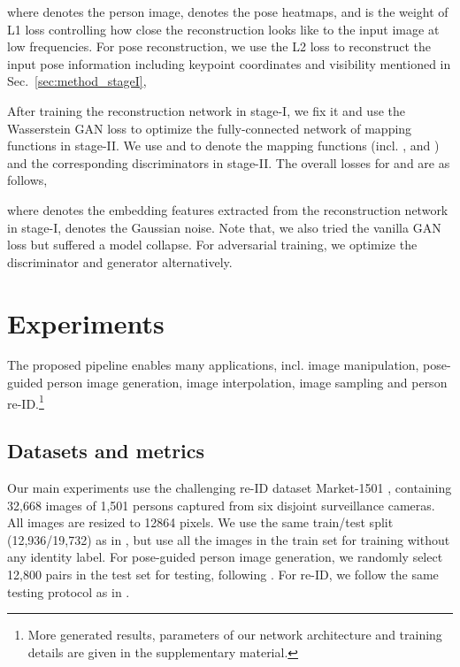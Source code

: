 \documentclass[10pt,twocolumn,letterpaper]{article}
\begin{document}
where  denotes the person image,  denotes the pose heatmaps, and  is the weight of L1 loss controlling how close the reconstruction looks like to the input image at low frequencies. 
For pose reconstruction, we use the L2 loss to reconstruct the input pose information including keypoint coordinates  and visibility  mentioned in Sec.~\ref{sec:method_stageI},
 


After training the reconstruction network in stage-\RN{1}, we fix it and use the Wasserstein GAN \cite{WGAN} loss to optimize the fully-connected network of mapping functions in stage-\RN{2}. We use  and  to denote the mapping functions (incl. ,  and ) and the corresponding discriminators in stage-\RN{2}.
The overall losses for  and  are as follows,
 
where  denotes the embedding features extracted from the reconstruction network in stage-\RN{1},  denotes the Gaussian noise.
Note that, we also tried the vanilla GAN loss but suffered a model collapse. 
For adversarial training, we optimize the discriminator and generator alternatively.


 \section{Experiments}
\vspace{-0.5mm}
\label{sec:experiments}
The proposed pipeline enables many applications, incl. image manipulation, pose-guided person image generation, image interpolation, image sampling and person re-ID.\footnote{More generated results, parameters of our network architecture and training details are given in the supplementary material.}

\subsection{Datasets and metrics}
\vspace{-1mm}

Our main experiments use the challenging re-ID dataset Market-1501 \cite{Market1501}, containing 32,668 images of 1,501 persons captured from six disjoint surveillance cameras. 
All images are resized to 12864 pixels. 
We use the same train/test split (12,936/19,732) as in \cite{Market1501}, but use all the images in the train set for training without any identity label. 
For pose-guided person image generation, we randomly select 12,800 pairs in the test set for testing, following \cite{PG2}. 
For re-ID, we follow the same testing protocol as in \cite{Market1501}.
\end{document}
